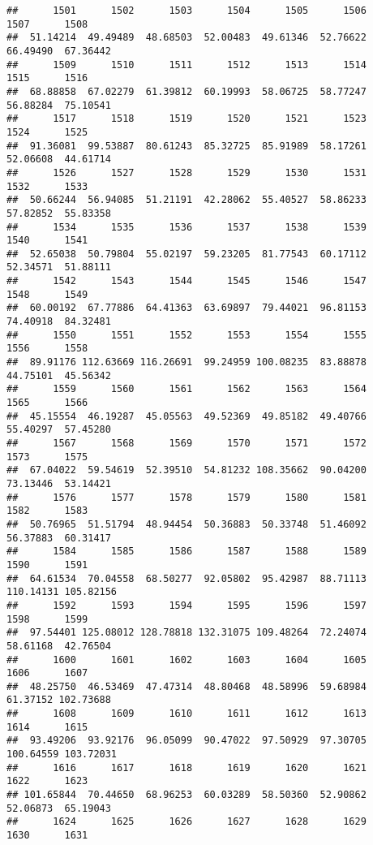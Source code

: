 \documentclass[
]{article}
\begin{document}
\begin{verbatim}
##      1501      1502      1503      1504      1505      1506      1507      1508 
##  51.14214  49.49489  48.68503  52.00483  49.61346  52.76622  66.49490  67.36442 
##      1509      1510      1511      1512      1513      1514      1515      1516 
##  68.88858  67.02279  61.39812  60.19993  58.06725  58.77247  56.88284  75.10541 
##      1517      1518      1519      1520      1521      1523      1524      1525 
##  91.36081  99.53887  80.61243  85.32725  85.91989  58.17261  52.06608  44.61714 
##      1526      1527      1528      1529      1530      1531      1532      1533 
##  50.66244  56.94085  51.21191  42.28062  55.40527  58.86233  57.82852  55.83358 
##      1534      1535      1536      1537      1538      1539      1540      1541 
##  52.65038  50.79804  55.02197  59.23205  81.77543  60.17112  52.34571  51.88111 
##      1542      1543      1544      1545      1546      1547      1548      1549 
##  60.00192  67.77886  64.41363  63.69897  79.44021  96.81153  74.40918  84.32481 
##      1550      1551      1552      1553      1554      1555      1556      1558 
##  89.91176 112.63669 116.26691  99.24959 100.08235  83.88878  44.75101  45.56342 
##      1559      1560      1561      1562      1563      1564      1565      1566 
##  45.15554  46.19287  45.05563  49.52369  49.85182  49.40766  55.40297  57.45280 
##      1567      1568      1569      1570      1571      1572      1573      1575 
##  67.04022  59.54619  52.39510  54.81232 108.35662  90.04200  73.13446  53.14421 
##      1576      1577      1578      1579      1580      1581      1582      1583 
##  50.76965  51.51794  48.94454  50.36883  50.33748  51.46092  56.37883  60.31417 
##      1584      1585      1586      1587      1588      1589      1590      1591 
##  64.61534  70.04558  68.50277  92.05802  95.42987  88.71113 110.14131 105.82156 
##      1592      1593      1594      1595      1596      1597      1598      1599 
##  97.54401 125.08012 128.78818 132.31075 109.48264  72.24074  58.61168  42.76504 
##      1600      1601      1602      1603      1604      1605      1606      1607 
##  48.25750  46.53469  47.47314  48.80468  48.58996  59.68984  61.37152 102.73688 
##      1608      1609      1610      1611      1612      1613      1614      1615 
##  93.49206  93.92176  96.05099  90.47022  97.50929  97.30705 100.64559 103.72031 
##      1616      1617      1618      1619      1620      1621      1622      1623 
## 101.65844  70.44650  68.96253  60.03289  58.50360  52.90862  52.06873  65.19043 
##      1624      1625      1626      1627      1628      1629      1630      1631 

\end{verbatim}
\end{document}
